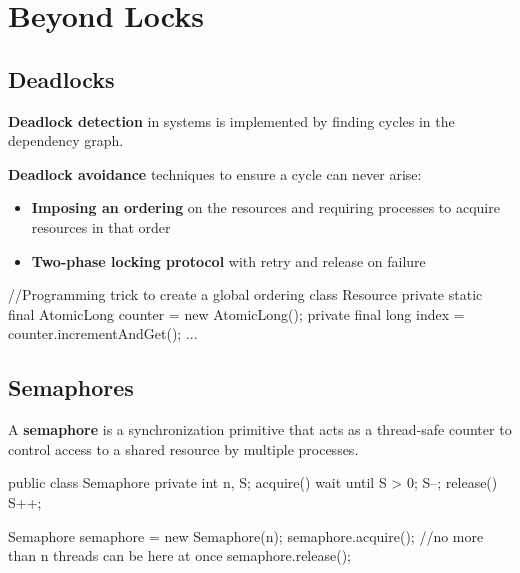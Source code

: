 \section{Beyond Locks}

\subsection{Deadlocks}

\begin{remark}
\textbf{Deadlock detection} in systems is implemented by finding cycles in the dependency graph.
\end{remark}

\begin{remark}
\textbf{Deadlock avoidance} techniques to ensure a cycle can never arise:
\begin{itemize}
    \item \textbf{Imposing an ordering} on the resources and requiring processes to acquire resources in that order
    \item \textbf{Two-phase locking protocol} with retry and release on failure
\end{itemize}
\end{remark}

\begin{codeexample}
//Programming trick to create a global ordering
class Resource {
    private static final AtomicLong counter = new AtomicLong();
    private final long index = counter.incrementAndGet();
    ...
}
\end{codeexample}

\subsection{Semaphores}

\begin{definition}
A \textbf{semaphore} is a synchronization primitive that acts as a thread-safe counter to control access to a shared resource by multiple processes.
\end{definition}

\begin{codeexample}
public class Semaphore {
    private int n, S;
    acquire() {
        wait until S > 0;
        S--;
    }
    release() {
        S++;
    }
}
\end{codeexample}

\begin{codeexample}
Semaphore semaphore = new Semaphore(n);
semaphore.acquire();
    //no more than n threads can be here at once
semaphore.release();
\end{codeexample}

